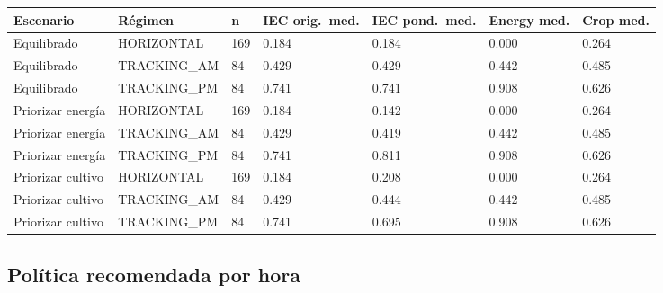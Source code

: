 \documentclass[11pt,a4paper]{article}
\begin{document}
\begin{longtable}{p{} p{} p{} p{} p{} p{} p{}}
\toprule
\textbf{Escenario} & \textbf{Régimen} & \textbf{n} & \textbf{IEC orig.\ med.} & \textbf{IEC pond.\ med.} & \textbf{Energy med.} & \textbf{Crop med.} \\
\midrule
Equilibrado       & HORIZONTAL    & 169 & 0.184 & 0.184 & 0.000 & 0.264 \\
Equilibrado       & TRACKING\_AM  & 84  & 0.429 & 0.429 & 0.442 & 0.485 \\
Equilibrado       & TRACKING\_PM  & 84  & 0.741 & 0.741 & 0.908 & 0.626 \\
\midrule
Priorizar energía & HORIZONTAL    & 169 & 0.184 & 0.142 & 0.000 & 0.264 \\
Priorizar energía & TRACKING\_AM  & 84  & 0.429 & 0.419 & 0.442 & 0.485 \\
Priorizar energía & TRACKING\_PM  & 84  & 0.741 & 0.811 & 0.908 & 0.626 \\
\midrule
Priorizar cultivo & HORIZONTAL    & 169 & 0.184 & 0.208 & 0.000 & 0.264 \\
Priorizar cultivo & TRACKING\_AM  & 84  & 0.429 & 0.444 & 0.442 & 0.485 \\
Priorizar cultivo & TRACKING\_PM  & 84  & 0.741 & 0.695 & 0.908 & 0.626 \\
\bottomrule
\end{longtable}

\subsection{Política recomendada por hora}
\end{document}

